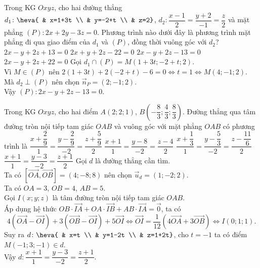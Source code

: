 \begin{ex}%
Trong KG $Oxyz$, cho hai đường thẳng $d_1\colon \heva{ & x=1+3t \\ & y=-2+t \\ & z=2}$, $d_2\colon \dfrac{x-1}{2}=\dfrac{y+2}{-1}=\dfrac{z}{2}$ và mặt phẳng $(P)\colon 2x+2y-3z=0$. Phương trình nào dưới đây là phương trình mặt phẳng đi qua giao điểm của $d_1$ và $(P)$, đồng thời vuông góc với $d_2$?
\choice
{$2x-y+2z+13=0$}
{$2x+y+2z-22=0$}
{\True $2x-y+2z-13=0$}
{$2x-y+2z+22=0$}
\loigiai
{
Gọi $d_1\cap (P)=M(1+3t;-2+t;2)$.\\
Vì $M\in (P)$ nên $2(1+3t)+2(-2+t)-6=0\Leftrightarrow t=1 \Leftrightarrow M(4;-1;2)$.\\
Mà $d_2\perp (P)$ nên chọn $\overrightarrow{n}_{P}=(2;-1;2)$.\\
Vậy $(P)\colon 2x-y+2z-13=0$.
}
\end{ex}

\begin{ex}%
Trong KG $Oxyz$, cho hai điểm $A(2;2;1)$, $B\left(-\dfrac{8}{3};\dfrac{4}{3};\dfrac{8}{3}\right)$. Đường thẳng qua tâm đường tròn nội tiếp tam giác $OAB$ và vuông góc với mặt phẳng $OAB$ có phương trình là
\choice
{$\dfrac{x+\dfrac{2}{9}}{1}=\dfrac{y-\dfrac{2}{9}}{-2}=\dfrac{z+\dfrac{5}{9}}{2}$}
{$\dfrac{x+1}{1}=\dfrac{y-8}{-2}=\dfrac{z-4}{2}$}
{$\dfrac{x+\dfrac{1}{3}}{1}=\dfrac{y-\dfrac{5}{3}}{-2}=\dfrac{z-\dfrac{11}{6}}{2}$}
{\True $\dfrac{x+1}{1}=\dfrac{y-3}{-2}=\dfrac{z+1}{2}$}
\loigiai
{
Gọi $d$ là đường thẳng cần tìm.\\
Ta có $\left[\overrightarrow{OA},\overrightarrow{OB}\right]=(4;-8;8)$ nên chọn $\overrightarrow{u}_{d}=(1;-2;2)$.\\
Ta có $OA=3$, $OB=4$, $AB=5$.\\
Gọi $I(x;y;z)$ là tâm đường tròn nội tiếp tam giác $OAB$.\\
Áp dụng hệ thức $OB\cdot\overrightarrow{IA}+OA\cdot\overrightarrow{IB}+AB\cdot\overrightarrow{IA}=\overrightarrow{0}$, ta có
$$4\left(\overrightarrow{OA}-\overrightarrow{OI}\right)+3\left(\overrightarrow{OB}-\overrightarrow{OI}\right)+5\overrightarrow{OI}\Leftrightarrow \overrightarrow{OI}=\dfrac{1}{12}\left(4\overrightarrow{OA}+3\overrightarrow{OB}\right)\Leftrightarrow I(0;1;1).$$
Suy ra $d\colon \heva{ & x=t \\ & y=1-2t \\ & z=1+2t}$, cho $t=-1$ ta có điểm $M(-1;3;-1)\in d$.\\
Vậy $d\colon \dfrac{x+1}{1}=\dfrac{y-3}{-2}=\dfrac{z+1}{2}$.
}
\end{ex}


